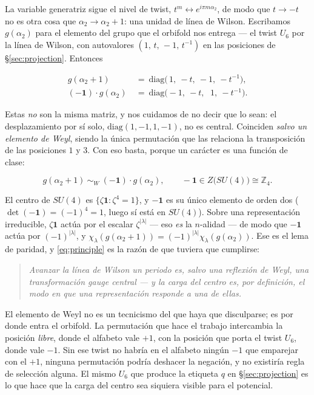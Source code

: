 \documentclass[11pt,a4paper]{article}
\newcommand{\ZZ}{\mathbb{Z}}
\newcommand{\lam}{|\lambda|}
\begin{document}
La variable generatriz sigue el nivel de twist, $t^m\leftrightarrow e^{i\pi m\alpha_2}$, de
modo que $t\to-t$ no es otra cosa que $\alpha_2\to\alpha_2+1$: una unidad de línea de Wilson.
Escribamos $g(\alpha_2)$ para el elemento del grupo que el orbifold nos entrega --- el twist
$U_6$ por la línea de Wilson, con autovalores $(1,\,t,\,-1,\,t^{-1})$ en las posiciones de
\S\ref{sec:projection}. Entonces

\[
\begin{aligned}
g(\alpha_2{+}1)\ &=\ \mathrm{diag}\big(\,1,\ -t,\ -1,\ -t^{-1}\big),\\[2pt]
(-\mathbf{1})\cdot g(\alpha_2)\ &=\ \mathrm{diag}\big(-1,\ -t,\ \ \,1,\ -t^{-1}\big).
\end{aligned}
\]

Estas \emph{no} son la misma matriz, y nos cuidamos de no decir que lo sean: el desplazamiento
por sí solo, $\mathrm{diag}(1,-1,1,-1)$, no es central. Coinciden \emph{salvo un elemento de
Weyl}, siendo la única permutación que las relaciona la transposición de las posiciones $1$
y $3$. Con eso basta, porque un carácter es una función de clase:

\begin{equation}\label{eq:principle}
\boxed{\ g(\alpha_2{+}1)\ \sim_{W}\ (-\mathbf{1})\cdot g(\alpha_2),
\qquad -\mathbf{1}\in Z\big(SU(4)\big)\cong\ZZ_4 .\ }
\end{equation}

El centro de $SU(4)$ es $\{\zeta\mathbf{1}:\zeta^4=1\}$, y $-\mathbf{1}$ es su único elemento
de orden dos ($\det(-\mathbf{1})=(-1)^4=1$, luego sí está en $SU(4)$). Sobre una representación
irreducible, $\zeta\mathbf{1}$ actúa por el escalar $\zeta^{\lam}$ --- eso \emph{es} la
$n$-alidad --- de modo que $-\mathbf{1}$ actúa por $(-1)^{\lam}$, y
$\chi_\lambda(g(\alpha_2{+}1))=(-1)^{\lam}\chi_\lambda(g(\alpha_2))$. Ese es el lema de
paridad, y \eqref{eq:principle} es la razón de que tuviera que cumplirse:

\begin{quote}
\emph{Avanzar la línea de Wilson un periodo es, salvo una reflexión de Weyl, una
transformación gauge central --- y la carga del centro es, por definición, el modo en que una
representación responde a una de ellas.}
\end{quote}

El elemento de Weyl no es un tecnicismo del que haya que disculparse; es por donde entra el
orbifold. La permutación que hace el trabajo intercambia la posición \emph{libre}, donde el
alfabeto vale $+1$, con la posición que porta el twist $U_6$, donde vale $-1$. Sin ese twist
no habría en el alfabeto ningún $-1$ que emparejar con el $+1$, ninguna permutación podría
deshacer la negación, y no existiría regla de selección alguna. El mismo $U_6$ que produce la
etiqueta $q$ en \S\ref{sec:projection} es lo que hace que la carga del centro sea siquiera
visible para el potencial.
\end{document}
